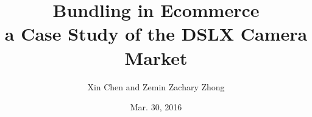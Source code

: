 \documentclass[xcolor=dvipsnames,11pt]{beamer}
\title[Bundling]{ Bundling in Ecommerce\\ a Case Study of the DSLX Camera Market}
\author[Chen and Zhong]{Xin Chen and Zemin Zachary Zhong}
\institute[UC Berkeley - Haas]{University of California -- Berkeley}
\date{Mar. 30, 2016}
\theoremstyle{definition}
\begin{document}
\begin{frame}

\titlepage
\end{frame}



%
%
%
%
%
%
%
%
%
%
%
%
%
%
%
%
%
%
%
%
%
%
%
%
%
%
%
%
%
\end{document}
